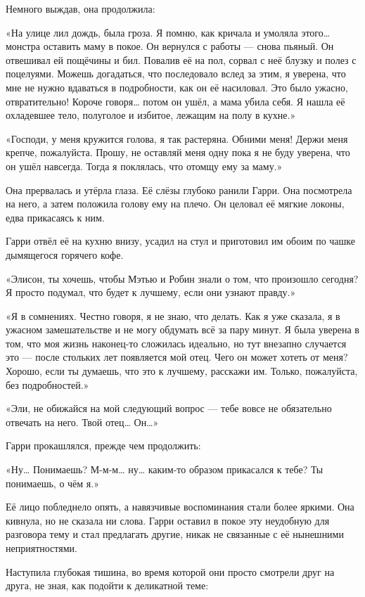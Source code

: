 \documentclass[a5paper, 9pt,
final, openany, twoside=true]{memoir}
\begin{document}
Немного выждав, она продолжила:

«На улице лил дождь, была гроза. Я помню, как кричала и умоляла этого… монстра оставить маму в покое. Он вернулся с работы — снова пьяный. Он отвешивал ей пощёчины и бил. Повалив её на пол, сорвал с неё блузку и полез с поцелуями. Можешь догадаться, что последовало вслед за этим, я уверена, что мне не нужно вдаваться в подробности, как он её насиловал. Это было ужасно, отвратительно! Короче говоря… потом он ушёл, а мама убила себя. Я нашла её охладевшее тело, полуголое и избитое, лежащим на полу в кухне.»

«Господи, у меня кружится голова, я так растеряна. Обними меня! Держи меня крепче, пожалуйста. Прошу, не оставляй меня одну пока я не буду уверена, что он ушёл навсегда. Тогда я поклялась, что отомщу ему за маму.»

Она прервалась и утёрла глаза. Её слёзы глубоко ранили Гарри. Она посмотрела на него, а затем положила голову ему на плечо. Он целовал её мягкие локоны, едва прикасаясь к ним.

Гарри отвёл её на кухню внизу, усадил на стул и приготовил им обоим по чашке дымящегося горячего кофе.

«Элисон, ты хочешь, чтобы Мэтью и Робин знали о том, что произошло сегодня? Я просто подумал, что будет к лучшему, если они узнают правду.»

«Я в сомнениях. Честно говоря, я не знаю, что делать. Как я уже сказала, я в ужасном замешательстве и не могу обдумать всё за пару минут. Я была уверена в том, что моя жизнь наконец-то сложилась идеально, но тут внезапно случается это — после стольких лет появляется мой отец. Чего он может хотеть от меня? Хорошо, если ты думаешь, что это к лучшему, расскажи им. Только, пожалуйста, без подробностей.»

«Эли, не обижайся на мой следующий вопрос — тебе вовсе не обязательно отвечать на него. Твой отец… Он…»

Гарри прокашлялся, прежде чем продолжить:

«Ну… Понимаешь? М-м-м… ну… каким-то образом прикасался к тебе? Ты понимаешь, о чём я.»

Её лицо побледнело опять, а навязчивые воспоминания стали более яркими. Она кивнула, но не сказала ни слова. Гарри оставил в покое эту неудобную для разговора тему и стал предлагать другие, никак не связанные с её нынешними неприятностями.\bigskip

	Наступила глубокая тишина, во время которой они просто смотрели друг на друга, не зная, как подойти к деликатной теме:
\end{document}
